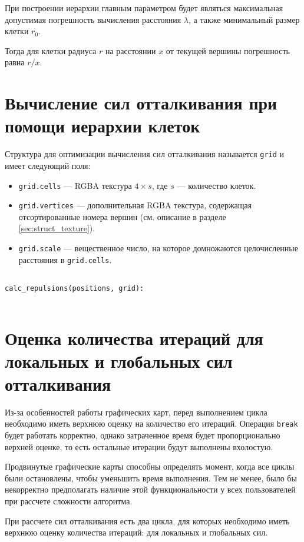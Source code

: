 При построении иерархии главным параметром будет являться максимальная допустимая погрешность вычисления расстояния $\lambda$, а также минимальный размер клетки $r_0$.

Тогда для клетки радиуса $r$ на расстоянии $x$ от текущей вершины погрешность равна $r / x$.

\section{Вычисление сил отталкивания при помощи иерархии клеток}

Структура для оптимизации вычисления сил отталкивания называется \texttt{grid} и имеет следующий поля:

\begin{itemize}
\item \texttt{grid.cells} --- RGBA текстура $4\times s$, где $s$ --- количество клеток.
\item \texttt{grid.vertices} --- дополнительная RGBA текстура, содержащая отсортированные номера вершин (см. описание в разделе \ref{sec:struct_texture}).
\item \texttt{grid.scale} --- вещественное число, на которое домножаются целочисленные расстояния в \texttt{grid.cells}.
\end{itemize}

\begin{verbatim}

calc_repulsions(positions, grid):
    

\end{verbatim}

\section{Оценка количества итераций для локальных и глобальных сил отталкивания}
\label{sec:iter_estimate}

Из-за особенностей работы графических карт, перед выполнением цикла необходимо иметь верхнюю оценку на количество его итераций. Операция \texttt{break} будет работать корректно, однако затраченное время будет пропорционально верхней оценке, то есть остальные итерации будут выполнены вхолостую.

Продвинутые графические карты способны определять момент, когда все циклы были остановлены, чтобы уменьшить время выполнения. Тем не менее, было бы некорректно предполагать наличие этой функциональности у всех пользователей при рассчете сложности алгоритма.

При рассчете сил отталкивания есть два цикла, для которых необходимо иметь верхнюю оценку количества итераций: для локальных и глобальных сил.


